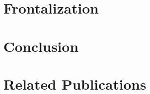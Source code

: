 \documentclass[11pt]{book}
\begin{document}
\chapter{Frontalization}
\label{ch:front}



\chapter{Conclusion}
\label{ch:conclusions}


\chapter*{Related Publications}
\label{ch:related_papers}




 
\end{document}

